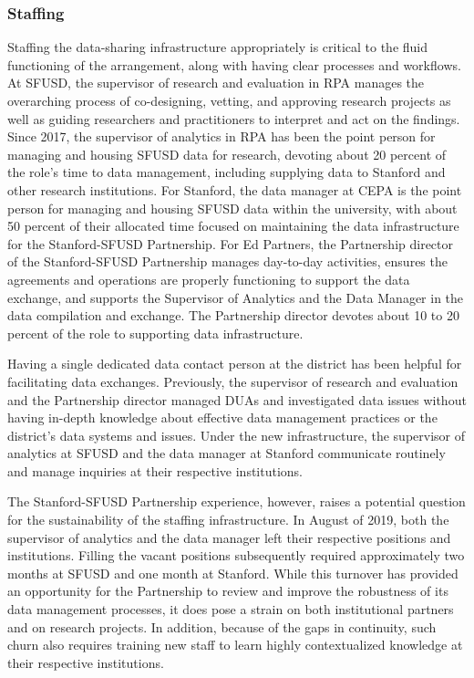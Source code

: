 \hypertarget{staffing}{%
\subsubsection{Staffing}\label{staffing}}

Staffing the data-sharing infrastructure appropriately is critical to the fluid functioning of the arrangement, along with having clear processes and workflows. At SFUSD, the supervisor of research and evaluation in RPA manages the overarching process of co-designing, vetting, and approving research projects as well as guiding researchers and practitioners to interpret and act on the findings. Since 2017, the supervisor of analytics in RPA has been the point person for managing and housing SFUSD data for research, devoting about 20 percent of the role's time to data management, including supplying data to Stanford and other research institutions. For Stanford, the data manager at CEPA is the point person for managing and housing SFUSD data within the university, with about 50 percent of their allocated time focused on maintaining the data infrastructure for the Stanford-SFUSD Partnership. For Ed Partners, the Partnership director of the Stanford-SFUSD Partnership manages day-to-day activities, ensures the agreements and operations are properly functioning to support the data exchange, and supports the Supervisor of Analytics and the Data Manager in the data compilation and exchange. The Partnership director devotes about 10 to 20 percent of the role to supporting data infrastructure.

Having a single dedicated data contact person at the district has been helpful for facilitating data exchanges. Previously, the supervisor of research and evaluation and the Partnership director managed DUAs and investigated data issues without having in-depth knowledge about effective data management practices or the district's data systems and issues. Under the new infrastructure, the supervisor of analytics at SFUSD and the data manager at Stanford communicate routinely and manage inquiries at their respective institutions.

The Stanford-SFUSD Partnership experience, however, raises a potential question for the sustainability of the staffing infrastructure. In August of 2019, both the supervisor of analytics and the data manager left their respective positions and institutions. Filling the vacant positions subsequently required approximately two months at SFUSD and one month at Stanford. While this turnover has provided an opportunity for the Partnership to review and improve the robustness of its data management processes, it does pose a strain on both institutional partners and on research projects. In addition, because of the gaps in continuity, such churn also requires training new staff to learn highly contextualized knowledge at their respective institutions.

